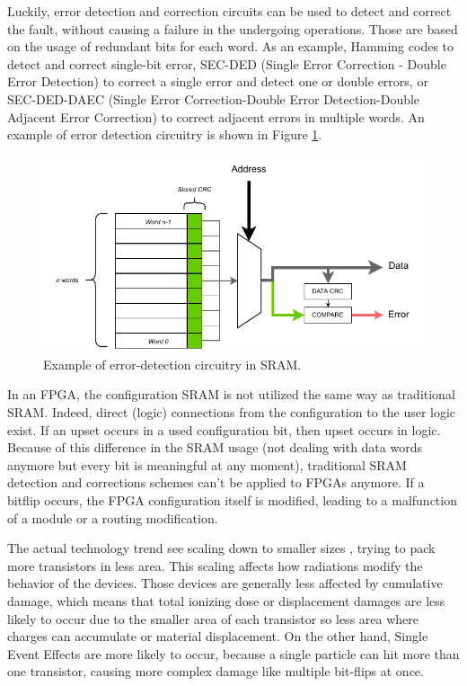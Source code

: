 Luckily, error detection and correction circuits can be used to detect and correct the fault, without causing a failure in the undergoing operations. Those are based on the usage of redundant bits for each word. As an example, Hamming codes to detect and correct single-bit error, SEC-DED (Single Error Correction - Double Error Detection) to correct a single error and detect one or double errors, or SEC-DED-DAEC \cite{9418432} (Single Error Correction-Double Error Detection-Double Adjacent Error Correction) to correct adjacent errors in multiple words. An example of error detection circuitry is shown in Figure \ref{fig:sram_det}.

\begin{figure}[H]
\centering
\includegraphics[width=1.0\linewidth]{images/chapter2/sram_detect.pdf}
\caption{Example of error-detection circuitry in SRAM.}
\label{fig:sram_det}
\end{figure}

In an FPGA, the configuration SRAM is not utilized the same way as traditional SRAM. Indeed, direct (logic) connections from the configuration to the user logic exist. If an upset occurs in a used configuration bit, then upset occurs in logic. Because of this difference in the SRAM usage (not dealing with data words anymore but every bit is meaningful at any moment), traditional SRAM detection and corrections schemes can't be applied to FPGAs anymore. If a bitflip occurs, the FPGA configuration itself is modified, leading to a malfunction of a module or a routing modification.\bigskip

The actual technology trend see scaling down to smaller sizes \cite{4033480}, trying to pack more transistors in less area. This scaling affects how radiations modify the behavior of the devices. Those devices are generally less affected by cumulative damage, which means that total ionizing dose or displacement damages are less likely to occur due to the smaller area of each transistor so less area where charges can accumulate or material displacement. On the other hand, Single Event Effects are more likely to occur, because a single particle can hit more than one transistor, causing more complex damage like multiple bit-flips at once. 
